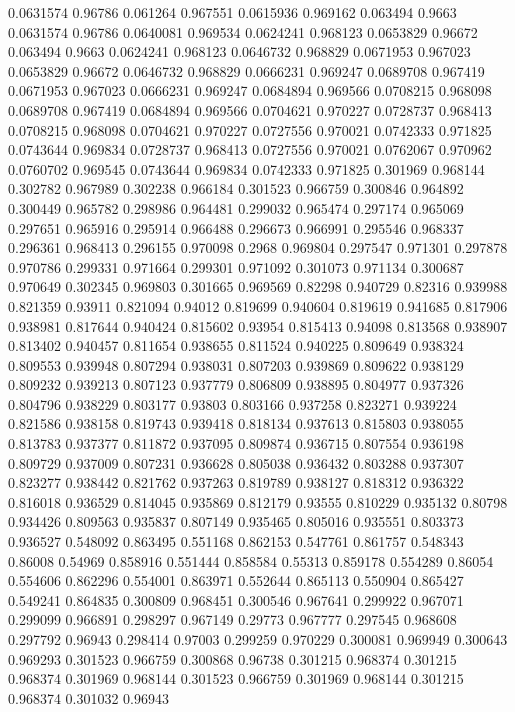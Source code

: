 0.0631574 0.96786
0.061264 0.967551
0.0615936 0.969162
0.063494 0.9663
0.0631574 0.96786
0.0640081 0.969534
0.0624241 0.968123
0.0653829 0.96672
0.063494 0.9663
0.0624241 0.968123
0.0646732 0.968829
0.0671953 0.967023
0.0653829 0.96672
0.0646732 0.968829
0.0666231 0.969247
0.0689708 0.967419
0.0671953 0.967023
0.0666231 0.969247
0.0684894 0.969566
0.0708215 0.968098
0.0689708 0.967419
0.0684894 0.969566
0.0704621 0.970227
0.0728737 0.968413
0.0708215 0.968098
0.0704621 0.970227
0.0727556 0.970021
0.0742333 0.971825
0.0743644 0.969834
0.0728737 0.968413
0.0727556 0.970021
0.0762067 0.970962
0.0760702 0.969545
0.0743644 0.969834
0.0742333 0.971825
0.301969 0.968144
0.302782 0.967989
0.302238 0.966184
0.301523 0.966759
0.300846 0.964892
0.300449 0.965782
0.298986 0.964481
0.299032 0.965474
0.297174 0.965069
0.297651 0.965916
0.295914 0.966488
0.296673 0.966991
0.295546 0.968337
0.296361 0.968413
0.296155 0.970098
0.2968 0.969804
0.297547 0.971301
0.297878 0.970786
0.299331 0.971664
0.299301 0.971092
0.301073 0.971134
0.300687 0.970649
0.302345 0.969803
0.301665 0.969569
0.82298 0.940729
0.82316 0.939988
0.821359 0.93911
0.821094 0.94012
0.819699 0.940604
0.819619 0.941685
0.817906 0.938981
0.817644 0.940424
0.815602 0.93954
0.815413 0.94098
0.813568 0.938907
0.813402 0.940457
0.811654 0.938655
0.811524 0.940225
0.809649 0.938324
0.809553 0.939948
0.807294 0.938031
0.807203 0.939869
0.809622 0.938129
0.809232 0.939213
0.807123 0.937779
0.806809 0.938895
0.804977 0.937326
0.804796 0.938229
0.803177 0.93803
0.803166 0.937258
0.823271 0.939224
0.821586 0.938158
0.819743 0.939418
0.818134 0.937613
0.815803 0.938055
0.813783 0.937377
0.811872 0.937095
0.809874 0.936715
0.807554 0.936198
0.809729 0.937009
0.807231 0.936628
0.805038 0.936432
0.803288 0.937307
0.823277 0.938442
0.821762 0.937263
0.819789 0.938127
0.818312 0.936322
0.816018 0.936529
0.814045 0.935869
0.812179 0.93555
0.810229 0.935132
0.80798 0.934426
0.809563 0.935837
0.807149 0.935465
0.805016 0.935551
0.803373 0.936527
0.548092 0.863495
0.551168 0.862153
0.547761 0.861757
0.548343 0.86008
0.54969 0.858916
0.551444 0.858584
0.55313 0.859178
0.554289 0.86054
0.554606 0.862296
0.554001 0.863971
0.552644 0.865113
0.550904 0.865427
0.549241 0.864835
0.300809 0.968451
0.300546 0.967641
0.299922 0.967071
0.299099 0.966891
0.298297 0.967149
0.29773 0.967777
0.297545 0.968608
0.297792 0.96943
0.298414 0.97003
0.299259 0.970229
0.300081 0.969949
0.300643 0.969293
0.301523 0.966759
0.300868 0.96738
0.301215 0.968374
0.301215 0.968374
0.301969 0.968144
0.301523 0.966759
0.301969 0.968144
0.301215 0.968374
0.301032 0.96943
